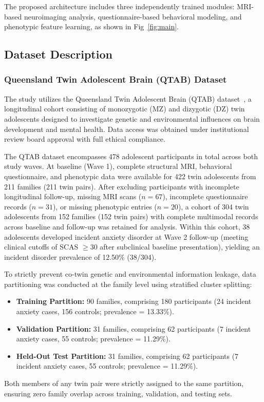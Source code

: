 \documentclass[10pt,letterpaper]{article}
\begin{document}
        The proposed architecture includes three independently trained modules: MRI-based neuroimaging analysis, questionnaire-based behavioral modeling, and phenotypic feature learning, as shown in Fig~\ref{fig:main}.

        \subsection*{Dataset Description}

        \subsubsection*{\textbf{Queensland Twin Adolescent Brain (QTAB) Dataset}}

        The study utilizes the Queensland Twin Adolescent Brain (QTAB) dataset~\cite{ref31}, a longitudinal cohort consisting of monozygotic (MZ) and dizygotic (DZ) twin adolescents designed to investigate genetic and environmental influences on brain development and mental health. Data access was obtained under institutional review board approval with full ethical compliance.

        The QTAB dataset encompasses 478 adolescent participants in total across both study waves. At baseline (Wave 1), complete structural MRI, behavioral questionnaire, and phenotypic data were available for 422 twin adolescents from 211 families (211 twin pairs). After excluding participants with incomplete longitudinal follow-up, missing MRI scans ($n = 67$), incomplete questionnaire records ($n = 31$), or missing phenotypic entries ($n = 20$), a cohort of 304 twin adolescents from 152 families (152 twin pairs) with complete multimodal records across baseline and follow-up was retained for analysis. Within this cohort, 38 adolescents developed incident anxiety disorder at Wave 2 follow-up (meeting clinical cutoffs of SCAS $\ge 30$ after subclinical baseline presentation), yielding an incident disorder prevalence of 12.50\% (38/304).

        To strictly prevent co-twin genetic and environmental information leakage, data partitioning was conducted at the family level using stratified cluster splitting:
        \begin{itemize}
            \item \textbf{Training Partition:} 90 families, comprising 180 participants (24 incident anxiety cases, 156 controls; prevalence = 13.33\%).
            \item \textbf{Validation Partition:} 31 families, comprising 62 participants (7 incident anxiety cases, 55 controls; prevalence = 11.29\%).
            \item \textbf{Held-Out Test Partition:} 31 families, comprising 62 participants (7 incident anxiety cases, 55 controls; prevalence = 11.29\%).
        \end{itemize}
        Both members of any twin pair were strictly assigned to the same partition, ensuring zero family overlap across training, validation, and testing sets.
\end{document}
